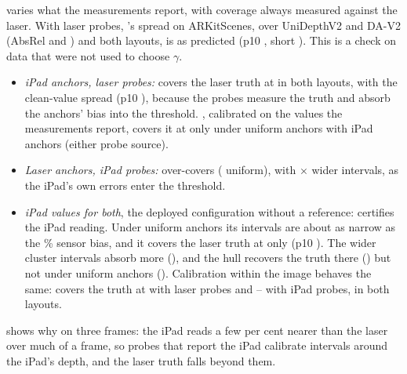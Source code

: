  varies what the measurements report, with coverage always measured against the laser.
With laser probes, \mDual's spread on ARKitScenes, over UniDepthV2 and DA-V2 (AbsRel \NumArkUniAbsRel{} and \NumArkDavAbsRel) and both layouts, is as predicted (p10 \NumEEighteenPTen, short \NumEEighteenShort).
This is a check on data that were not used to choose $\gamma$.
\begin{itemize}[leftmargin=*,itemsep=1pt,topsep=2pt]
\item \emph{iPad anchors, laser probes:} \mDual covers the laser truth at \NumEEighteenCovIL{} in both layouts, with the clean-value spread (p10 \NumEEighteenPTen), because the probes measure the truth and absorb the anchors' bias into the threshold.
\mDistSplit, calibrated on the values the measurements report, covers it at only \NumEEighteenDistIpad{} under uniform anchors with iPad anchors (either probe source).
\item \emph{Laser anchors, iPad probes:} \mDual over-covers (\NumEEighteenCovLI{} uniform), with \NumEEighteenWiden$\times$ wider intervals, as the iPad's own errors enter the threshold.
\item \emph{iPad values for both}, the deployed configuration without a reference: \mDual certifies the iPad reading.
Under uniform anchors its intervals are about as narrow as the \NumArkIpadOffset\% sensor bias, and it covers the laser truth at only \NumEEighteenCovII{} (p10 \NumEEighteenPTenII).
The wider cluster intervals absorb more (\NumEEighteenCovIICluster), and the hull \mDualBoth recovers the truth there (\NumEEighteenHullIICluster) but not under uniform anchors (\NumEEighteenHullII).
Calibration within the image behaves the same: \mLocalSplit covers the truth at \NumEEighteenLocalSplitLaserLo{} with laser probes and \NumEEighteenLocalSplitIpadLo--\NumEEighteenLocalSplitIpadHi{} with iPad probes, in both layouts.
\end{itemize}
 shows why on three frames: the iPad reads a few per cent nearer than the laser over much of a frame, so probes that report the iPad calibrate intervals around the iPad's depth, and the laser truth falls beyond them.

